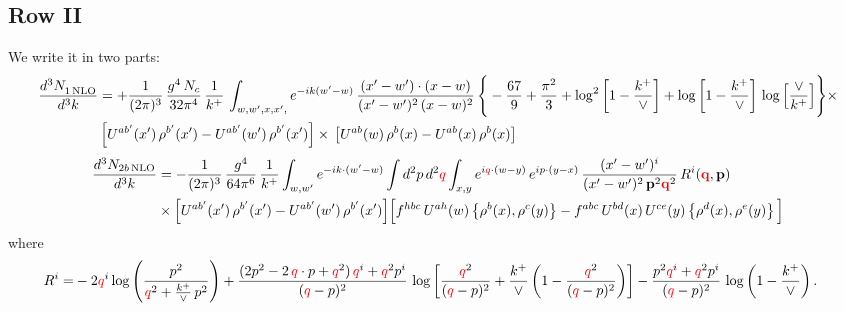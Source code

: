 \documentclass[9pt]{article}
\numberwithin{equation}{section}
\begin{document}
\subsection{Row II}
We write it in two parts:
\begin{align}
     \frac{d^{3}N_{1\,\rm NLO}^{\rm}}{d^{3}k} &  =  +\frac{1}{(2\pi)^{3}}\, \frac{g^{4}\,N_{c}}{32\pi^{4}}\,\frac{1}{k^{+}}\, \int_{w, w',x,x',} e^{-ik(w^\prime-w)}\, \frac{(x'-w')\cdot (x-w)}{(x'-w')^{2}\, (x-w)^{2}}\, \Bigg\{ -\frac{67}{9}+\frac{\pi^{2}}{3}+\log^{2}{\left[1-\frac{k^{+}}{\vee}\right]}+\log{\left[1-\frac{k^{+}}{\vee}\right]}\,\log{\left[\frac{\vee}{k^{+}}\right]}\Bigg\}\times\notag \\ & \left[U^{ab'}(x')\,\rho^{b'}(x') - U^{ab'}(w')\,\rho^{b'}(x')\right]\times\,\left[U^{ab}(w)\,\rho^{b}(x) - U^{ab}(x)\,\rho^{b}(x)\right]
\end{align}  
\begin{align}
\frac{d^{3}N_{2b\,\rm NLO}}{d^{3}k} & = -\frac{1}{(2\pi)^{3}}\,\frac{g^{4}}{64\pi^{6}}\,\frac{1}{k^{+}}\int_{w,w'} e^{-ik\cdot(w'-w)}
\int d^{2}p\,d^{2}{\color{red}q}\int_{x,y} e^{i{\color{red}q}\cdot(w-y)}\,e^{ip\cdot(y-x)}\,\frac{(x'-w')^{i}}{(x'-w')^{2}\,\mathbf{p}^{2}{\color{red}\mathbf{q}}^{2}}\,R^{i}({\color{red}\mathbf{q}},\mathbf{p})\notag\\
&\times\Big[U^{ab'}(x')\,\rho^{b'}(x')-U^{ab'}(w')\,\rho^{b'}(x')\Big]
\Big[f^{hbc}\,U^{ah}(w)\left\{\rho^{b}(x),\rho^{c}(y)\right\}-f^{abc}\,U^{bd}(x)\,U^{ce}(y)\left\{\rho^{d}(x),\rho^{e}(y)\right\}\Big]
\end{align}
where
\begin{align}
R^{i} =& -2{\color{red}q}^{i}\log\left(\frac{p^{2}}{{\color{red}q}^{2}+\frac{k^{+}}{\vee}\,p^{2}}\right)
+\frac{(2p^{2}-2\,{\color{red}q}\cdot p+{\color{red}q}^{2})\,{\color{red}q}^{i}+{\color{red}q}^{2}p^{i}}{({\color{red}q}-p)^{2}}\,
\log\left[\frac{{\color{red}q}^{2}}{({\color{red}q}-p)^{2}}+\frac{k^{+}}{\vee}\left(1-\frac{{\color{red}q}^{2}}{({\color{red}q}-p)^{2}}\right)\right]
-\frac{p^{2}{\color{red}q}^{i}+{\color{red}q}^{2}p^{i}}{({\color{red}q}-p)^{2}}\,\log\left(1-\frac{k^{+}}{\vee}\right).
\end{align}
\end{document}

